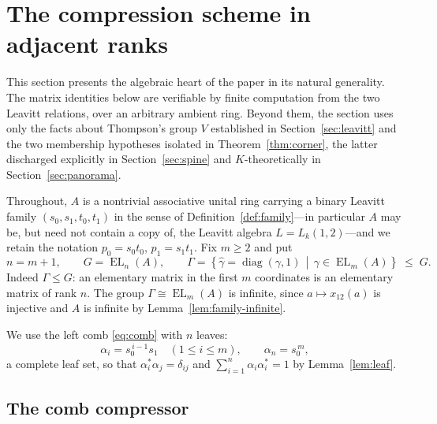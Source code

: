 \documentclass[11pt]{amsart}
\theoremstyle{definition}
\theoremstyle{plain}
\newcommand{\EL}{\operatorname{EL}}
\newcommand{\set}[1]{\left\{#1\right\}}
\newcommand{\suchthat}{\,\middle|\,}
\DeclareMathOperator{\diag}{diag}
\begin{document}
\section{The compression scheme in adjacent ranks}\label{sec:scheme}

This section presents the algebraic heart of the paper in its natural generality.  The matrix identities below are verifiable by finite computation from the two Leavitt relations, over an arbitrary ambient ring.  Beyond them, the section uses only the facts about Thompson's group \(V\) established in Section~\ref{sec:leavitt} and the two membership hypotheses isolated in Theorem~\ref{thm:corner}, the latter discharged explicitly in Section~\ref{sec:spine} and $K$-theoretically in Section~\ref{sec:panorama}.

Throughout, \(A\) is a nontrivial associative unital ring carrying a binary Leavitt family \((s_0,s_1,t_0,t_1)\) in the sense of Definition~\ref{def:family}---in particular \(A\) may be, but need not contain a copy of, the Leavitt algebra \(L=L_k(1,2)\)---and we retain the notation \(p_0=s_0t_0\), \(p_1=s_1t_1\).  Fix \(m\geq2\) and put
\[
 n=m+1,
 \qquad
 G=\EL_n(A),
 \qquad
 \Gamma=\set{\hat\gamma=\diag(\gamma,1)\suchthat\gamma\in\EL_m(A)}\;\leq\;G .
\]
Indeed \(\Gamma\leq G\): an elementary matrix in the first \(m\) coordinates is an elementary matrix of rank \(n\).  The group \(\Gamma\cong\EL_m(A)\) is infinite, since \(a\mapsto x_{12}(a)\) is injective and \(A\) is infinite by Lemma~\ref{lem:family-infinite}.

We use the left comb \eqref{eq:comb} with \(n\) leaves:
\begin{equation}\label{eq:leaves}
 \alpha_i=s_0^{\,i-1}s_1\quad(1\leq i\leq m),
 \qquad
 \alpha_n=s_0^{\,m},
\end{equation}
a complete leaf set, so that \(\alpha_i^*\alpha_j=\delta_{ij}\) and \(\sum_{i=1}^n\alpha_i\alpha_i^*=1\) by Lemma~\ref{lem:leaf}.

\subsection{The comb compressor}\label{subsec:compressor}
\end{document}

